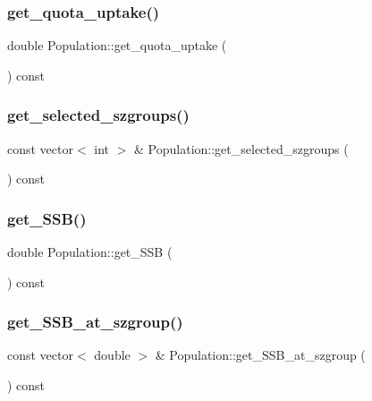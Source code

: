 \mbox{\label{class_population_a22fee0ab6062785e1ac22cdfd435c99e}} 
\subsubsection{\texorpdfstring{get\_quota\_uptake()}{get\_quota\_uptake()}}
{\footnotesize\ttfamily double Population\+::get\+\_\+quota\+\_\+uptake (\begin{DoxyParamCaption}{ }\end{DoxyParamCaption}) const}

\mbox{\label{class_population_a15281fffe73cc53524f119a20d8a4762}} 
\subsubsection{\texorpdfstring{get\_selected\_szgroups()}{get\_selected\_szgroups()}}
{\footnotesize\ttfamily const vector$<$ int $>$ \& Population\+::get\+\_\+selected\+\_\+szgroups (\begin{DoxyParamCaption}{ }\end{DoxyParamCaption}) const}

\mbox{\label{class_population_a8d5f00e07f966275471f0326dd05ca76}} 
\subsubsection{\texorpdfstring{get\_SSB()}{get\_SSB()}}
{\footnotesize\ttfamily double Population\+::get\+\_\+\+S\+SB (\begin{DoxyParamCaption}{ }\end{DoxyParamCaption}) const}

\mbox{\label{class_population_a539011e43cd2730b55bff9b6e9067460}} 
\subsubsection{\texorpdfstring{get\_SSB\_at\_szgroup()}{get\_SSB\_at\_szgroup()}}
{\footnotesize\ttfamily const vector$<$ double $>$ \& Population\+::get\+\_\+\+S\+S\+B\+\_\+at\+\_\+szgroup (\begin{DoxyParamCaption}{ }\end{DoxyParamCaption}) const}

